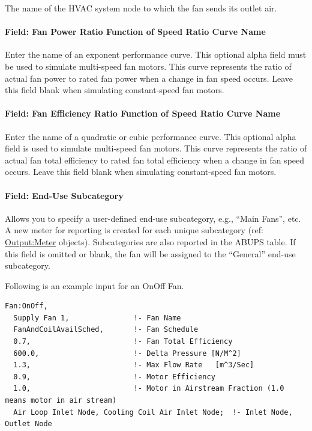 The name of the HVAC system node to which the fan sends its outlet air.

\paragraph{Field: Fan Power Ratio Function of Speed Ratio Curve Name}\label{field-fan-power-ratio-function-of-speed-ratio-curve-name}

Enter the name of an exponent performance curve. This optional alpha field must be used to simulate multi-speed fan motors. This curve represents the ratio of actual fan power to rated fan power when a change in fan speed occurs. Leave this field blank when simulating constant-speed fan motors.

\paragraph{Field: Fan Efficiency Ratio Function of Speed Ratio Curve Name}\label{field-fan-efficiency-ratio-function-of-speed-ratio-curve-name}

Enter the name of a quadratic or cubic performance curve. This optional alpha field is used to simulate multi-speed fan motors. This curve represents the ratio of actual fan total efficiency to rated fan total efficiency when a change in fan speed occurs. Leave this field blank when simulating constant-speed fan motors.

\paragraph{Field: End-Use Subcategory}

Allows you to specify a user-defined end-use subcategory, e.g., ``Main Fans'', etc. A new meter for reporting is created for each unique subcategory (ref: \hyperref[outputmeter-and-outputmetermeterfileonly]{Output:Meter} objects). Subcategories are also reported in the ABUPS table. If this field is omitted or blank, the fan will be assigned to the ``General'' end-use subcategory.

Following is an example input for an OnOff Fan.

\begin{lstlisting}
Fan:OnOff,
  Supply Fan 1,               !- Fan Name
  FanAndCoilAvailSched,       !- Fan Schedule
  0.7,                        !- Fan Total Efficiency
  600.0,                      !- Delta Pressure [N/M^2]
  1.3,                        !- Max Flow Rate   [m^3/Sec]
  0.9,                        !- Motor Efficiency
  1.0,                        !- Motor in Airstream Fraction (1.0 means motor in air stream)
  Air Loop Inlet Node, Cooling Coil Air Inlet Node;  !- Inlet Node, Outlet Node
\end{lstlisting}

